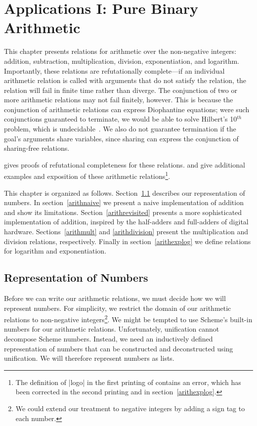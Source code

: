 \chapter{Applications I:  Pure Binary Arithmetic}\label{arithchapter}

This chapter presents relations for arithmetic over the non-negative
integers: addition, subtraction, multiplication, division,
exponentiation, and logarithm.  Importantly, these relations are
refutationally complete---if an individual arithmetic relation is
called with arguments that do not satisfy the relation, the relation
will fail in finite time rather than diverge. The conjunction of two
or more arithmetic relations may not fail finitely, however. This is
because the conjunction of arithmetic relations can express
Diophantine equations; were such conjunctions guaranteed to terminate,
we would be able to solve Hilbert's 10$^{th}$ problem, which is
undecidable~\cite{hilbertstenth}.  We also do not guarantee
termination if the goal's arguments share variables, since sharing can
express the conjunction of sharing-free relations.

\citet{conf/flops/KiselyovBFS08} gives proofs of refutational
completeness for these relations.  \citet{trs} and
\citet{conf/flops/KiselyovBFS08} give additional examples and
exposition of these arithmetic relations\footnote{The definition of
  \scheme|logo| in the first printing of \citet{trs} contains an
  error, which has been corrected in the second printing and in
  section~\ref{arithexplog}.}.

This chapter is organized as follows.  Section~\ref{arithrep}
describes our representation of numbers.  In section~\ref{arithnaive}
we present a naive implementation of addition and show its
limitations.  Section~\ref{arithrevisited} presents a more
sophisticated implementation of addition, inspired by the half-adders
and full-adders of digital hardware.  Sections~\ref{arithmult} and
\ref{arithdivision} present the multiplication and division relations,
respectively.  Finally in section~\ref{arithexplog} we define
relations for logarithm and exponentiation.


\section{Representation of Numbers}\label{arithrep}

Before we can write our arithmetic relations, we must decide how we
will represent numbers.  For simplicity, we restrict the domain of our
arithmetic relations to non-negative integers\footnote{We could extend
  our treatment to negative integers by adding a sign tag to each
  number.}.  We might be tempted to use Scheme's built-in numbers for
our arithmetic relations.  Unfortunately, unification cannot decompose
Scheme numbers.  Instead, we need an inductively defined
representation of numbers that can be constructed and deconstructed
using unification.  We will therefore represent numbers as lists.

